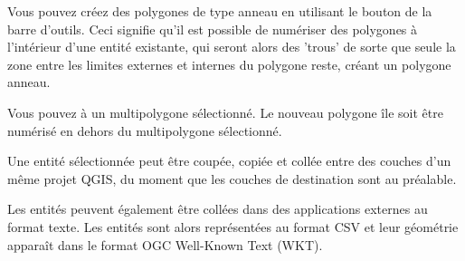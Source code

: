 \begin{itemize}

Vous pouvez créez des polygones de type anneau en utilisant le bouton  de la barre d'outils. Ceci signifie qu'il est possible de numériser des polygones à l'intérieur d'une entité existante, qui seront alors des 'trous' de sorte que seule la zone entre les limites externes et internes du polygone reste, créant un polygone anneau.


Vous pouvez  à un multipolygone sélectionné. Le nouveau polygone île soit être numérisé en dehors du multipolygone sélectionné.


Une entité sélectionnée peut être coupée, copiée et collée entre des couches d'un même projet QGIS, du moment que les couches de destination sont  au préalable.

Les entités peuvent également être collées dans des applications externes au format texte. Les entités sont alors représentées au format CSV et leur géométrie apparaît dans le format OGC Well-Known Text (WKT).


\end{itemize}
